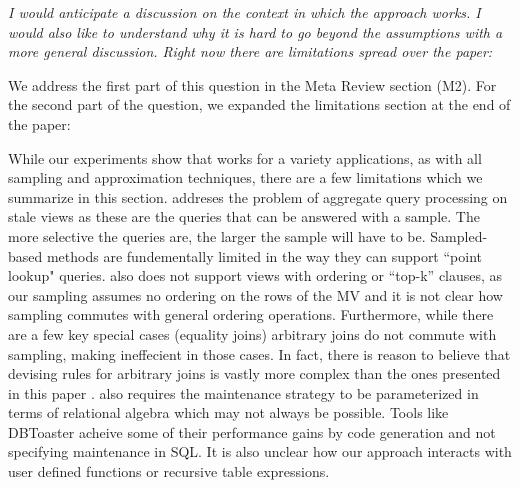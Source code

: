 \vspace{1em}
\emph{I would anticipate a discussion on the context in which the approach works. I would also like to understand why it is hard to go beyond the assumptions with a more general discussion. Right now there are limitations spread over the paper: }

We address the first part of this question in the Meta Review section (M2). For the second part of the question, we expanded the limitations section at the end of the paper:
\begin{displayquote}
While our experiments show that \svc works for a variety applications, as with all sampling and approximation techniques, there are a few limitations which we summarize in this section.
\svc addreses the problem of aggregate query processing on stale views as these are the queries that can be answered with a sample.
The more selective the queries are, the larger the sample will have to be.
Sampled-based methods are fundementally limited in the way they can support ``point lookup" queries.
\svc also does not support views with ordering or ``top-k'' clauses, as our sampling assumes no ordering on the rows of the MV and it is not clear how sampling commutes with general ordering operations.
Furthermore, while there are a few key special cases (equality joins) arbitrary joins do not commute with sampling, making \svc ineffecient in those cases.
In fact, there is reason to believe that devising rules for arbitrary joins is vastly more complex than the ones presented in this paper \cite{DBLP:journals/pvldb/NirkhiwaleDJ13}.
\svc also requires the maintenance strategy to be parameterized in terms of relational algebra which may not always be possible.
Tools like DBToaster acheive some of their performance gains by code generation and not specifying maintenance in SQL.
It is also unclear how our approach interacts with user defined functions or recursive table expressions.
\end{displayquote}

